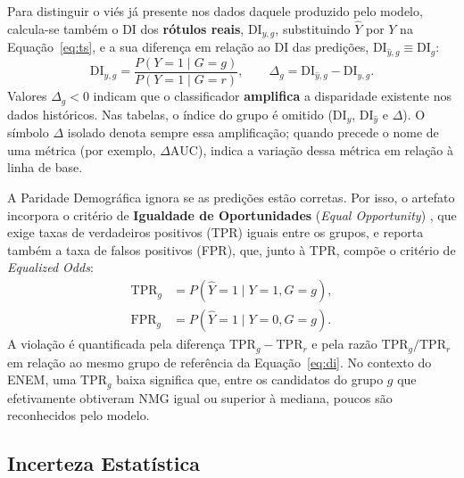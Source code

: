 Para distinguir o viés já presente nos dados daquele produzido pelo modelo, calcula-se também o DI dos \textbf{rótulos reais}, $\mathrm{DI}_{y,g}$, substituindo $\hat{Y}$ por $Y$ na Equação~\eqref{eq:ts}, e a sua diferença em relação ao DI das predições, $\mathrm{DI}_{\hat{y},g} \equiv \mathrm{DI}_g$:
\begin{equation}
\mathrm{DI}_{y,g} = \frac{P(Y=1 \mid G=g)}{P(Y=1 \mid G=r)}, \qquad \Delta_g = \mathrm{DI}_{\hat{y},g} - \mathrm{DI}_{y,g}.
\label{eq:amplificacao}
\end{equation}
Valores $\Delta_g < 0$ indicam que o classificador \textbf{amplifica} a disparidade existente nos dados históricos. Nas tabelas, o índice do grupo é omitido ($\mathrm{DI}_y$, $\mathrm{DI}_{\hat{y}}$ e $\Delta$). O símbolo $\Delta$ isolado denota sempre essa amplificação; quando precede o nome de uma métrica (por exemplo, $\Delta\mathrm{AUC}$), indica a variação dessa métrica em relação à linha de base.

A Paridade Demográfica ignora se as predições estão corretas. Por isso, o artefato incorpora o critério de \textbf{Igualdade de Oportunidades} (\textit{Equal Opportunity}) \cite{hardt2016equality}, que exige taxas de verdadeiros positivos (TPR) iguais entre os grupos, e reporta também a taxa de falsos positivos (FPR), que, junto à TPR, compõe o critério de \textit{Equalized Odds}:
\begin{align}
\mathrm{TPR}_g &= P(\hat{Y} = 1 \mid Y = 1, G = g), \label{eq:tpr}\\
\mathrm{FPR}_g &= P(\hat{Y} = 1 \mid Y = 0, G = g). \label{eq:fpr}
\end{align}
A violação é quantificada pela diferença $\mathrm{TPR}_g - \mathrm{TPR}_r$ e pela razão $\mathrm{TPR}_g / \mathrm{TPR}_r$ em relação ao mesmo grupo de referência da Equação~\eqref{eq:di}. No contexto do ENEM, uma $\mathrm{TPR}_g$ baixa significa que, entre os candidatos do grupo $g$ que efetivamente obtiveram NMG igual ou superior à mediana, poucos são reconhecidos pelo modelo.

\subsection{Incerteza Estatística}

